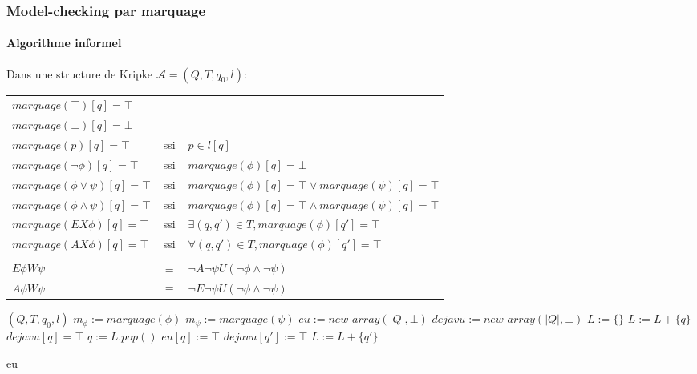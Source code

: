 \documentclass[11pt]{beamer}
\begin{document}
\begin{frame}
    \frametitle{Model-checking par marquage}
    \framesubtitle{Algorithme informel}

    Dans une structure de Kripke $\mathcal{A}=(Q, T, q_0, l)$:\\\bigskip
    \begin{tabular}{lcl}
        $marquage(\top)[q] = \top$&&\\
        $marquage(\bot)[q] = \bot$&&\\
        $marquage(p)[q] = \top$&ssi& $p\in l[q]$\\
        $marquage(\neg \phi)[q] = \top$&ssi&$marquage(\phi)[q] = \bot$\\
        $marquage(\phi \lor \psi)[q] = \top$&ssi&$marquage(\phi)[q] = \top \lor marquage(\psi)[q] = \top$\\
        $marquage(\phi \land \psi)[q] = \top$&ssi&$marquage(\phi)[q] = \top \land marquage(\psi)[q] = \top$\\
        $marquage(EX\phi)[q] = \top$&ssi&$\exists (q, q') \in T, marquage(\phi)[q'] = \top$\\
        $marquage(AX\phi)[q] = \top$&ssi&$\forall (q, q') \in T, marquage(\phi)[q'] = \top$\\\\\pause
        $E\phi W \psi$ &$\equiv$ &$\neg A \neg \psi U (\neg \phi \land \neg \psi)$\\
        $A\phi W \psi$ &$\equiv$ &$\neg E \neg \psi U (\neg \phi \land \neg \psi)$\\
    \end{tabular}
\end{frame}

\begin{algorithm}[h!]
\caption{$E\phi U\psi$}

\begin{multicols}{2}
\begin{algorithmic}[1]
    \REQUIRE $(Q, T, q_0, l)$
    \STATE $m_\phi := marquage(\phi)$
    \STATE $m_\psi := marquage(\psi)$
    \STATE $eu := new\_array(|Q|, \bot)$
    \STATE $dejavu := new\_array(|Q|, \bot)$
    \STATE $L := \{\}$
            \STATE $L := L + \{ q \}$
            \STATE $dejavu[q] = \top$
        \ENDIF
    \ENDFOR
        \STATE $q := L.pop()$
        \STATE $eu[q] := \top$
                \STATE $dejavu[q'] := \top$
                    \STATE $L := L + \{q'\}$
                \ENDIF
            \ENDIF
        \ENDFOR
    \ENDWHILE

    \RETURN eu
\end{algorithmic}
\end{multicols}
\end{algorithm}
\end{document}
